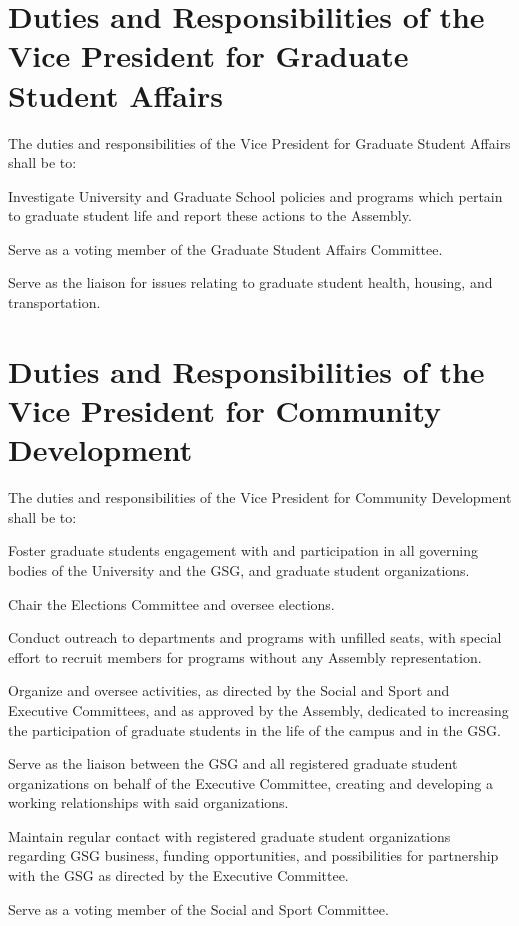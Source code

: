 \section{Duties and Responsibilities of the Vice President for Graduate Student Affairs}
The duties and responsibilities of the Vice President for Graduate Student Affairs shall be to:
\begin{bylaws-number}
  \item Investigate University and Graduate School policies and programs which pertain to graduate student life and report these actions to the Assembly.
  \item Serve as a voting member of the Graduate Student Affairs Committee.
  \item Serve as the liaison for issues relating to graduate student health, housing, and transportation.
  \item 
\end{bylaws-number}

\section{Duties and Responsibilities of the Vice President for Community Development}
The duties and responsibilities of the Vice President for Community Development shall be to:
\begin{bylaws-number}
  \item Foster graduate students engagement with and participation in all governing bodies of the University and the GSG, and graduate student organizations.
  \begin{bylaws-number}
  	\item Chair the Elections Committee and oversee elections.
  	\item Conduct outreach to departments and programs with unfilled seats, with special effort to recruit members for programs without any Assembly representation.
  \end{bylaws-number}
  \item Organize and oversee activities, as directed by the Social and Sport and Executive Committees, and as approved by the Assembly, dedicated to increasing the participation of graduate students in the life of the campus and in the GSG.
  \item Serve as the liaison between the GSG and all registered graduate student organizations on behalf of the Executive Committee, creating and developing a working relationships with said organizations.
  \item Maintain regular contact with registered graduate student organizations regarding GSG business, funding opportunities, and possibilities for partnership with the GSG as directed by the Executive Committee.
  \item Serve as a voting member of the Social and Sport Committee.
\end{bylaws-number}

